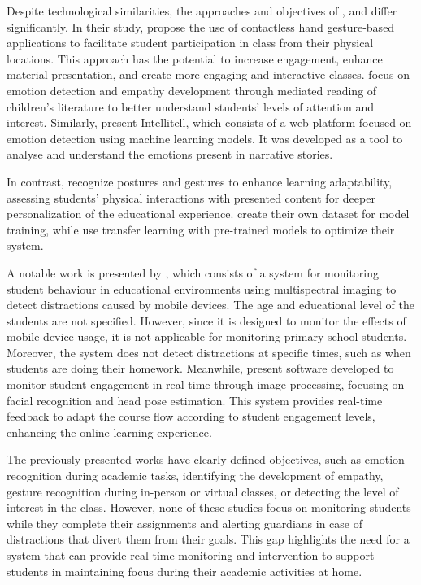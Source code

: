 \documentclass[a4paper,fleqn]{cas-sc}
\begin{document}
			Despite technological similarities, the approaches and objectives of %
			\cite{Erazo2016Easing}, %
			\cite{Nguyen2019} and %
			\cite{Riquelme2013} differ significantly. In their study, \cite{Erazo2016Easing} propose the use of contactless hand gesture-based applications to facilitate student participation in class from their physical locations. This approach has the potential to increase engagement, enhance material presentation, and create more engaging and interactive classes.
			\cite{Nguyen2019} focus on emotion detection and empathy development through mediated reading of children's literature to better understand students' levels of attention and interest. Similarly, \cite{Argel2023Intellitell} %
			present Intellitell, which consists of a web platform focused on emotion detection using machine learning models. It was developed as a tool to analyse and understand the emotions present in narrative stories.
		
			In contrast, \cite{Riquelme2013} recognize postures and gestures to enhance learning adaptability, assessing students' physical interactions with presented content for deeper personalization of the educational experience. %
			\cite{Nguyen2019} create their own dataset for model training, while %
			\cite{Riquelme2013} use transfer learning with pre-trained models to optimize their system.
			
			A notable work is presented by \cite{Campbell2015Using}, which consists of a system for monitoring student behaviour in educational environments using multispectral imaging to detect distractions caused by mobile devices. The age and educational level of the students are not specified. However, since it is designed to monitor the effects of mobile device usage, it is not applicable for monitoring primary school students. Moreover, the system does not detect distractions at specific times, such as when students are doing their homework. Meanwhile, \cite{Ucar2022Recognizing} present software developed to monitor student engagement in real-time through image processing, focusing on facial recognition and head pose estimation. This system provides real-time feedback to adapt the course flow according to student engagement levels, enhancing the online learning experience.
			
			The previously presented works have clearly defined objectives, such as emotion recognition during academic tasks, identifying the development of empathy, gesture recognition during in-person or virtual classes, or detecting the level of interest in the class. However, none of these studies focus on monitoring students while they complete their assignments and alerting guardians in case of distractions that divert them from their goals. This gap highlights the need for a system that can provide real-time monitoring and intervention to support students in maintaining focus during their academic activities at home.
			
\end{document}
